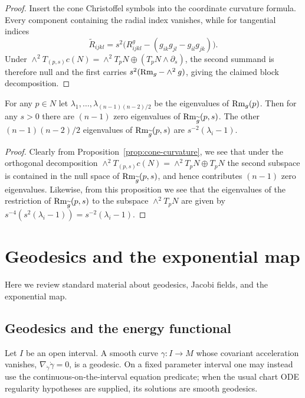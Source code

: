 \begin{proof}
\sketch
{}
Insert the cone Christoffel symbols into the coordinate curvature formula. Every component containing the radial index vanishes, while for tangential indices
\[
  \widetilde R_{ijkl}=s^2\bigl(R^g_{ijkl}-(g_{ik}g_{jl}-g_{il}g_{jk})\bigr).
\]
Under $\wedge^2T_{(p,s)}c(N)=\wedge^2T_pN\oplus(T_pN\wedge\partial_s)$, the second summand is therefore null and the first carries $s^2(\operatorname{Rm}_g-\wedge^2g)$, giving the claimed block decomposition.
\end{proof}

\begin{corollary}
\label{cor:cone-eigenvalues}

For any $p\in N$ let $\lambda_1,\ldots,\lambda_{(n-1)(n-2)/2}$ be
the eigenvalues of $\operatorname{Rm}_g(p)$. Then for any $s>0$  there are
$(n-1)$ zero eigenvalues of $\operatorname{Rm}_{\widetilde g}(p,s)$. The other
$(n-1)(n-2)/2$ eigenvalues of $\operatorname{Rm}_{\widetilde g}(p,s)$ are
$s^{-2}(\lambda_i-1)$.
\end{corollary}


\begin{proof}
\sketch
{}
Clearly from Proposition~\ref{prop:cone-curvature}, we see that under the
orthogonal decomposition $\wedge^2T_{(p,s)}c(N)=\wedge^2T_pN\oplus
T_pN$ the second subspace is contained in the null space of $ \operatorname{Rm}_{\widetilde g}(p,s)$, and hence contributes $(n-1)$ zero
eigenvalues. Likewise, from this proposition we see that the
eigenvalues of the restriction of $\operatorname{Rm}_{\widetilde g}(p,s)$ to the
subspace $\wedge^2T_pN$ are  given by
$s^{-4}(s^2(\lambda_i-1))=s^{-2}(\lambda_i-1)$.
\end{proof}


\section{Geodesics and the exponential map}

Here we review standard material about geodesics, Jacobi fields, and
the exponential map.

\subsection{Geodesics and the energy functional}

\begin{definition}[Geodesic]
\label{def:geodesic}




Let $I$ be an open interval. A smooth curve $\gamma\colon I\to M$ whose
covariant acceleration vanishes, $\nabla_{\dot\gamma}\dot\gamma=0$, is a
geodesic. On a fixed parameter interval one may instead use the
continuous-on-the-interval equation predicate; when the usual chart ODE
regularity hypotheses are supplied, its solutions are smooth geodesics.
\end{definition}

